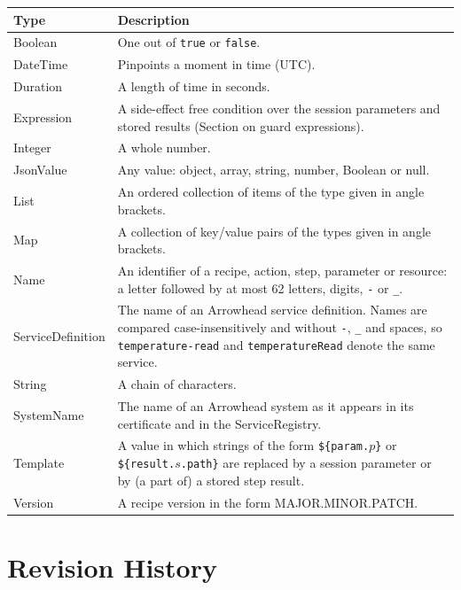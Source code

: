 \documentclass[a4paper]{arrowhead}
\newcommand{\pdef}[1]{{\textcolor{ArrowheadGrey}{#1\label{sec:model:primitives:#1}\label{sec:model:primitives:#1s}\label{sec:model:primitives:#1es}}}}
\begin{document}
{\small
\begin{longtable}{|p{3.2cm}|p{12.6cm}|}

\hline
\rowcolor{gray!33} Type & Description \\ \hline
\endhead
\pdef{Boolean} & One out of \texttt{true} or \texttt{false}. \\ \hline
\pdef{DateTime} & Pinpoints a moment in time (UTC). \\ \hline
\pdef{Duration} & A length of time in seconds. \\ \hline
\pdef{Expression} & A side-effect free condition over the session parameters and stored results (Section on guard expressions). \\ \hline
\pdef{Integer} & A whole number. \\ \hline
\pdef{JsonValue} & Any value: object, array, string, number, Boolean or null. \\ \hline
\pdef{List} & An ordered collection of items of the type given in angle brackets. \\ \hline
\pdef{Map} & A collection of key/value pairs of the types given in angle brackets. \\ \hline
\pdef{Name} & An identifier of a recipe, action, step, parameter or resource: a letter followed by at most 62 letters, digits, \texttt{-} or \texttt{\_}. \\ \hline
\pdef{ServiceDefinition} & The name of an Arrowhead service definition. Names are compared case-insensitively and without \texttt{-}, \texttt{\_} and spaces, so \texttt{temperature-read} and \texttt{temperatureRead} denote the same service. \\ \hline
\pdef{String} & A chain of characters. \\ \hline
\pdef{SystemName} & The name of an Arrowhead system as it appears in its certificate and in the ServiceRegistry. \\ \hline
\pdef{Template} & A value in which strings of the form \texttt{\$\{param.$p$\}} or \texttt{\$\{result.$s$.path\}} are replaced by a session parameter or by (a part of) a stored step result. \\ \hline
\pdef{Version} & A recipe version in the form MAJOR.MINOR.PATCH. \\ \hline
\end{longtable}
}


\newpage



\newpage

\section{Revision History}
\end{document}

